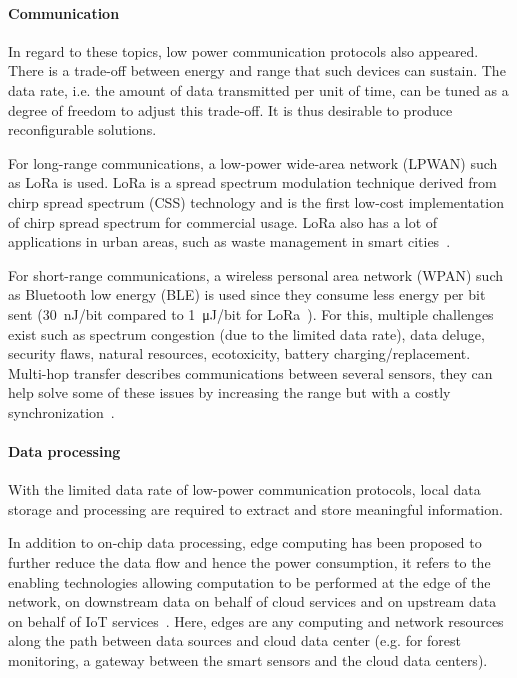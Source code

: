 \documentclass{EPL-master-thesis-covers-EN}
\begin{document}
\paragraph{Communication}

In regard to these topics, low power communication protocols also appeared. There is a trade-off between energy and range that such devices can sustain. The data rate, i.e. the amount of data transmitted per unit of time, can be tuned as a degree of freedom to adjust this trade-off. It is thus desirable to produce reconfigurable solutions.

For long-range communications, a low-power wide-area network (LPWAN) such as LoRa is used. LoRa is a spread spectrum modulation technique derived from chirp spread spectrum (CSS) technology and is the first low-cost implementation of chirp spread spectrum for commercial usage. LoRa also has a lot of applications in urban areas, such as waste management in smart cities~\cite{Cerchecci}.

For short-range communications, a wireless personal area network (WPAN) such as Bluetooth low energy (BLE) is used since they consume less energy per bit sent (\SI{30}{nJ/bit} compared to \SI{1}{\micro J/bit} for LoRa~\cite{Local_Sensor_Data_Processing}). For this, multiple challenges exist such as spectrum congestion (due to the limited data rate), data deluge, security flaws, natural resources, ecotoxicity, battery charging/replacement. Multi-hop transfer describes communications between several sensors, they can help solve some of these issues by increasing the range but with a costly synchronization~\cite{bol2018}.

\paragraph{Data processing}

With the limited data rate of low-power communication protocols, local data storage and processing are required to extract and store meaningful information.

In addition to on-chip data processing, edge computing has been proposed to further reduce the data flow and hence the power consumption, it refers to the enabling technologies allowing computation to be performed at the edge of the network, on downstream data on behalf of cloud services and on upstream data on behalf of IoT services~\cite{Shi2016}. Here, edges are any computing and network resources along the path between data sources and cloud data center (e.g. for forest monitoring, a gateway between the smart sensors and the cloud data centers). 
\end{document}
